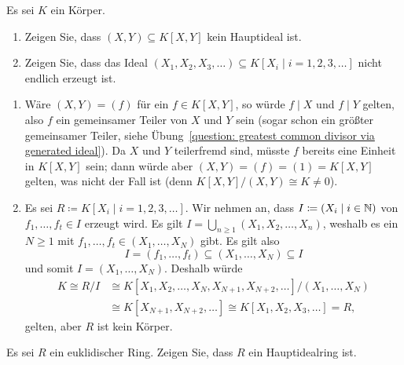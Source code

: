 \begin{question}[subtitle = Gegenbeispiele]
  \label{question: examples for non principal and not finitely generated modules}
  Es sei $K$ ein Körper.
  \begin{enumerate}
    \item
      Zeigen Sie, dass $(X,Y) \subseteq K[X,Y]$ kein Hauptideal ist.
    \item
      Zeigen Sie, dass das Ideal $(X_1, X_2, X_3, \dotsc) \subseteq K[X_i \mid i = 1, 2, 3, \dotsc]$ nicht endlich erzeugt ist.
  \end{enumerate}
\end{question}


\begin{solution}
  \begin{enumerate}
    \item
      Wäre $(X,Y) = (f)$ für ein $f \in K[X,Y]$, so würde $f \mid X$ und $f \mid Y$ gelten, also $f$ ein gemeinsamer Teiler von $X$ und $Y$ sein (sogar schon ein größter gemeinsamer Teiler, siehe Übung~\ref{question: greatest common divisor via generated ideal}).
      Da $X$ und $Y$ teilerfremd sind, müsste $f$ bereits eine Einheit in $K[X,Y]$ sein;
      dann würde aber $(X,Y) = (f) = (1) = K[X,Y]$ gelten, was nicht der Fall ist (denn $K[X,Y]/(X,Y) \cong K \neq 0$).
    \item
      Es sei $R \coloneqq K[X_i \mid i = 1, 2, 3, \dotsc]$.
      Wir nehmen an, dass $I \coloneqq (X_i \mid i \in \mathbb{N})$ von $f_1, \dotsc, f_t \in I$ erzeugt wird.
      Es gilt $I = \bigcup_{n \geq 1} (X_1, X_2, \dotsc, X_n)$, weshalb es ein $N \geq 1$ mit $f_1, \dotsc, f_t \in (X_1, \dotsc, X_N)$ gibt.
      Es gilt also
      \[
        I = (f_1, \dotsc, f_t) \subseteq (X_1, \dotsc, X_N) \subseteq I
      \]
      und somit $I = (X_1, \dotsc, X_N)$.
      Deshalb würde
      \begin{align*}
                K
         \cong  R/I
        &\cong  K[X_1, X_2, \dotsc, X_N, X_{N+1}, X_{N+2}, \dotsc]/(X_1, \dotsc, X_N)
        \\
        &\cong  K[X_{N+1}, X_{N+2}, \dotsc]
         \cong  K[X_1, X_2, X_3, \dotsc]
         =      R,
      \end{align*}
      gelten, aber $R$ ist kein Körper.
  \end{enumerate}
\end{solution}


\begin{question}[subtitle = Euklidische Ringe sind Hauptidealringe]
  Es sei $R$ ein euklidischer Ring.
  Zeigen Sie, dass $R$ ein Hauptidealring ist.
\end{question}


